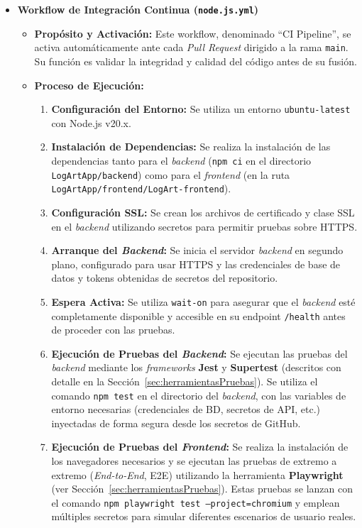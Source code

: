     \begin{itemize}
        \item \textbf{Workflow de Integración Continua (\texttt{node.js.yml})}
            \begin{itemize}
                \item \textbf{Propósito y Activación:} Este workflow, denominado ``CI Pipeline'', se activa automáticamente ante cada \textit{Pull Request} dirigido a la rama \texttt{main}. Su función es validar la integridad y calidad del código antes de su fusión.
                \item \textbf{Proceso de Ejecución:}
                    \begin{enumerate}
                        \item \textbf{Configuración del Entorno:} Se utiliza un entorno \texttt{ubuntu-latest} con Node.js v20.x.
                        \item \textbf{Instalación de Dependencias:} Se realiza la instalación de las dependencias tanto para el \textit{backend} (\texttt{npm ci} en el directorio \texttt{LogArtApp/backend}) como para el \textit{frontend} (en la ruta \texttt{LogArtApp/frontend/LogArt-frontend}).
                        \item \textbf{Configuración SSL:} Se crean los archivos de certificado y clase SSL en el \textit{backend} utilizando secretos para permitir pruebas sobre HTTPS.
                        \item \textbf{Arranque del \textit{Backend}:} Se inicia el servidor \textit{backend} en segundo plano, configurado para usar HTTPS y las credenciales de base de datos y tokens obtenidas de secretos del repositorio.
                        \item \textbf{Espera Activa:} Se utiliza \texttt{wait-on} para asegurar que el \textit{backend} esté completamente disponible y accesible en su endpoint \texttt{/health} antes de proceder con las pruebas.
                        \item \textbf{Ejecución de Pruebas del \textit{Backend}:} Se ejecutan las pruebas del \textit{backend} mediante los \textit{frameworks} \textbf{Jest} y \textbf{Supertest} (descritos con detalle en la Sección~\ref{sec:herramientasPruebas}). Se utiliza el comando \texttt{npm test} en el directorio del \textit{backend}, con las variables de entorno necesarias (credenciales de BD, secretos de API, etc.) inyectadas de forma segura desde los secretos de GitHub.
                        \item \textbf{Ejecución de Pruebas del \textit{Frontend}:} Se realiza la instalación de los navegadores necesarios y se ejecutan las pruebas de extremo a extremo (\textit{End-to-End}, E2E) utilizando la herramienta \textbf{Playwright} (ver Sección~\ref{sec:herramientasPruebas}). Estas pruebas se lanzan con el comando \texttt{npm playwright test --project=chromium} y emplean múltiples secretos para simular diferentes escenarios de usuario reales.

\end{enumerate}
\end{itemize}
\end{itemize}
